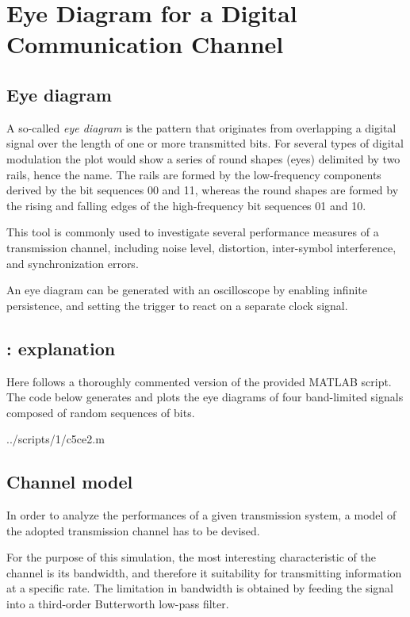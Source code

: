\section{Eye Diagram for a Digital Communication Channel}

\subsection{Eye diagram}
A so-called \emph{eye diagram} is the pattern that originates from overlapping a digital signal over the length of one or more transmitted bits.
For several types of digital modulation the plot would show a series of round shapes (eyes) delimited by two rails, hence the name.
The rails are formed by the low-frequency components derived by the bit sequences 00 and 11, whereas the round shapes are formed by the rising and falling edges of the high-frequency bit sequences 01 and 10.

This tool is commonly used to investigate several performance measures of a transmission channel, including noise level, distortion, inter-symbol interference, and synchronization errors.

An eye diagram can be generated with an oscilloscope by enabling infinite persistence, and setting the trigger to react on a separate clock signal.


\subsection{: explanation}
Here follows a thoroughly commented version of the provided  MATLAB script.
The code below generates and plots the eye diagrams of four band-limited signals composed of random sequences of bits.

\begin{lstinputlisting}[language=Octave]{../scripts/1/c5ce2.m}
\end{lstinputlisting}


\subsection{Channel model}
In order to analyze the performances of a given transmission system, a model of the adopted transmission channel has to be devised.

For the purpose of this simulation, the most interesting characteristic of the channel is its bandwidth, and therefore it suitability for transmitting information at a specific rate.
The limitation in bandwidth is obtained by feeding the signal into a third-order Butterworth low-pass filter.

